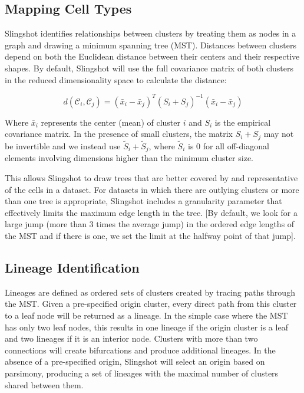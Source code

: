 \documentclass[11pt]{article}\usepackage[]{graphicx}\usepackage[]{color}
\begin{document}
\subsection{Mapping Cell Types}
Slingshot identifies relationships between clusters by treating them as nodes in a graph and drawing a minimum spanning tree (MST). Distances between clusters depend on both the Euclidean distance between their centers and their respective shapes. By default, Slingshot will use the full covariance matrix of both clusters in the reduced dimensionality space to calculate the distance:

$$d(\mathcal{C}_i,\mathcal{C}_j) = (\bar{x}_i - \bar{x}_j)^T (S_i + S_j)^{-1} (\bar{x}_i - \bar{x}_j)$$

Where $\bar{x}_i$ represents the center (mean) of cluster $i$ and $S_i$ is the empirical covariance matrix. In the presence of small clusters, the matrix $S_i + S_j$ may not be invertible and we instead use $\tilde{S}_i + \tilde{S}_j$, where $\tilde{S}_i$ is $0$ for all off-diagonal elements involving dimensions higher than the minimum cluster size.

This allows Slingshot to draw trees that are better covered by and representative of the cells in a dataset. For datasets in which there are outlying clusters or more than one tree is appropriate, Slingshot includes a granularity parameter that effectively limits the maximum edge length in the tree. [By default, we look for a large jump (more than 3 times the average jump) in the ordered edge lengths of the MST and if there is one, we set the limit at the halfway point of that jump]. 

\subsection{Lineage Identification}
Lineages are defined as ordered sets of clusters created by tracing paths through the MST. Given a pre-specified origin cluster, every direct path from this cluster to a leaf node will be returned as a lineage. In the simple case where the MST has only two leaf nodes, this results in one lineage if the origin cluster is a leaf and two lineages if it is an interior node. Clusters with more than two connections will create bifurcations and produce additional lineages. In the absence of a pre-specified origin, Slingshot will select an origin based on parsimony, producing a set of lineages with the maximal number of clusters shared between them.
\end{document}
